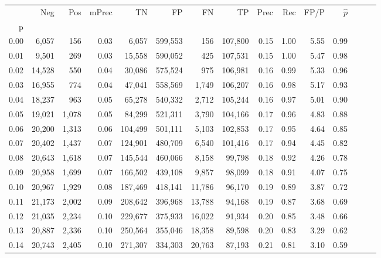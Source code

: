 \begin{tabular}{rrrrrrrrrrrrrrr}
\toprule
{} &     Neg &    Pos & mPrec &       TN &       FP &       FN &       TP &  Prec &   Rec &  FP/P & $\hat{p}$ \\
p    &         &        &       &          &          &          &          &       &       &       &           \\
\midrule
0.00 &   6,057 &    156 &  0.03 &    6,057 &  599,553 &      156 &  107,800 &  0.15 &  1.00 &  5.55 &      0.99 \\
0.01 &   9,501 &    269 &  0.03 &   15,558 &  590,052 &      425 &  107,531 &  0.15 &  1.00 &  5.47 &      0.98 \\
0.02 &  14,528 &    550 &  0.04 &   30,086 &  575,524 &      975 &  106,981 &  0.16 &  0.99 &  5.33 &      0.96 \\
0.03 &  16,955 &    774 &  0.04 &   47,041 &  558,569 &    1,749 &  106,207 &  0.16 &  0.98 &  5.17 &      0.93 \\
0.04 &  18,237 &    963 &  0.05 &   65,278 &  540,332 &    2,712 &  105,244 &  0.16 &  0.97 &  5.01 &      0.90 \\
0.05 &  19,021 &  1,078 &  0.05 &   84,299 &  521,311 &    3,790 &  104,166 &  0.17 &  0.96 &  4.83 &      0.88 \\
0.06 &  20,200 &  1,313 &  0.06 &  104,499 &  501,111 &    5,103 &  102,853 &  0.17 &  0.95 &  4.64 &      0.85 \\
0.07 &  20,402 &  1,437 &  0.07 &  124,901 &  480,709 &    6,540 &  101,416 &  0.17 &  0.94 &  4.45 &      0.82 \\
0.08 &  20,643 &  1,618 &  0.07 &  145,544 &  460,066 &    8,158 &   99,798 &  0.18 &  0.92 &  4.26 &      0.78 \\
0.09 &  20,958 &  1,699 &  0.07 &  166,502 &  439,108 &    9,857 &   98,099 &  0.18 &  0.91 &  4.07 &      0.75 \\
0.10 &  20,967 &  1,929 &  0.08 &  187,469 &  418,141 &   11,786 &   96,170 &  0.19 &  0.89 &  3.87 &      0.72 \\
0.11 &  21,173 &  2,002 &  0.09 &  208,642 &  396,968 &   13,788 &   94,168 &  0.19 &  0.87 &  3.68 &      0.69 \\
0.12 &  21,035 &  2,234 &  0.10 &  229,677 &  375,933 &   16,022 &   91,934 &  0.20 &  0.85 &  3.48 &      0.66 \\
0.13 &  20,887 &  2,336 &  0.10 &  250,564 &  355,046 &   18,358 &   89,598 &  0.20 &  0.83 &  3.29 &      0.62 \\
0.14 &  20,743 &  2,405 &  0.10 &  271,307 &  334,303 &   20,763 &   87,193 &  0.21 &  0.81 &  3.10 &      0.59 \\

\end{tabular}
